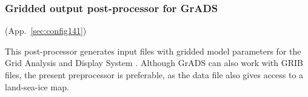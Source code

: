 \vsssub
\subsubsection{Gridded output post-processor for GrADS} \label{sec:gxoutf}
\vsssub

 (App.~\ref{sec:config141})

\vspace{\baselineskip} 
\noindent 
This post-processor generates input files with gridded model parameters for
the Grid Analysis and Display System \citep[GrADS,][]{man:GrADS}. 
Although GrADS can also work with GRIB files, the present preprocessor is preferable,
as the data file also gives access to a land-sea-ice map.

\pb
